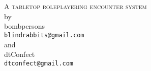 \begin{titlepage}
\begin{center}

~\\[1.0cm]

\textsc{\LARGE {}}\\
\textsc{\Large A tabletop roleplayering encounter system}\\[3.0cm]

{\normalsize by}\\
{\Large bombpersons}\\
{\Large \nolinkurl{blindrabbits@gmail.com}}\\[3.0cm]

{\normalsize and}\\
{\Large dtConfect}\\
{\Large \nolinkurl{dtconfect@gmail.com}}\\[3.0cm]

\vfill

\end{center}
\end{titlepage}